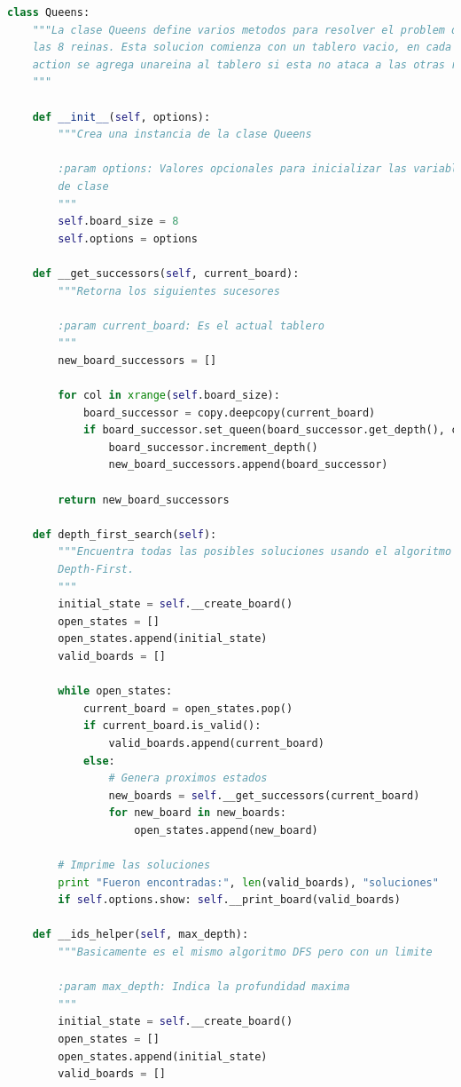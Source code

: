 \documentclass[letter, 10pt]{article}
\begin{document}
\begin{lstlisting}[language=python,frame=single]
    class Queens:
    """La clase Queens define varios metodos para resolver el problem de 
    las 8 reinas. Esta solucion comienza con un tablero vacio, en cada 
    action se agrega unareina al tablero si esta no ataca a las otras reinas.
    """

    def __init__(self, options):
        """Crea una instancia de la clase Queens

        :param options: Valores opcionales para inicializar las variables 
        de clase
        """
        self.board_size = 8
        self.options = options
    
    def __get_successors(self, current_board):
        """Retorna los siguientes sucesores

        :param current_board: Es el actual tablero
        """
        new_board_successors = []

        for col in xrange(self.board_size):
            board_successor = copy.deepcopy(current_board)
            if board_successor.set_queen(board_successor.get_depth(), col):
                board_successor.increment_depth()
                new_board_successors.append(board_successor)

        return new_board_successors
    
    def depth_first_search(self):
        """Encuentra todas las posibles soluciones usando el algoritmo 
        Depth-First.
        """
        initial_state = self.__create_board()
        open_states = []
        open_states.append(initial_state)
        valid_boards = []

        while open_states:
            current_board = open_states.pop()
            if current_board.is_valid():
                valid_boards.append(current_board)
            else:
                # Genera proximos estados
                new_boards = self.__get_successors(current_board)
                for new_board in new_boards:
                    open_states.append(new_board)

        # Imprime las soluciones
        print "Fueron encontradas:", len(valid_boards), "soluciones"
        if self.options.show: self.__print_board(valid_boards)
    
    def __ids_helper(self, max_depth):
        """Basicamente es el mismo algoritmo DFS pero con un limite

        :param max_depth: Indica la profundidad maxima
        """
        initial_state = self.__create_board()
        open_states = []
        open_states.append(initial_state)
        valid_boards = []


\end{lstlisting}
\end{document}
